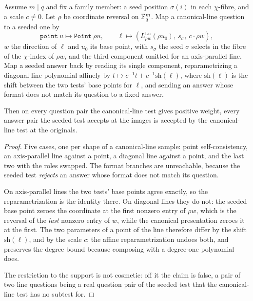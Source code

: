 \begin{lemma}
\label{lem:lidt-cl-adapter-maps}
\leanok
Assume $m\mid q$ and fix a family member: a seed position $\sigma(i)$ in each $\chi$-fibre, and a
scale $c\neq0$. Let $\rho$ be coordinate reversal on $\mathbb{F}_q^m$. Map a canonical-line question to a
seeded one by
\[
  \mathtt{point}\ u \mapsto \mathtt{Point}\ \rho u,\qquad
  \ell \mapsto (L^{\mathrm{Ln}}_{\rho w}(\rho u_0),\ s_{\sigma},\ c\cdot\rho w),
\]
$w$ the direction of $\ell$ and $u_0$ its base point, with $s_\sigma$ the seed $\sigma$ selects in
the fibre of the $\chi$-index of $\rho w$, and the third component omitted for an axis-parallel
line. Map a seeded answer back by reading its single component, reparametrizing a diagonal-line
polynomial affinely by $t\mapsto c^{-1}t+c^{-1}\mathrm{sh}(\ell)$, where $\mathrm{sh}(\ell)$ is the
shift between the two tests' base points for $\ell$, and sending an answer whose format does not
match its question to a fixed answer.

Then on every question pair the canonical-line test gives positive weight, every answer pair the
seeded test accepts at the images is accepted by the canonical-line test at the originals.
\end{lemma}

\begin{proof}
\leanok
Five cases, one per shape of a canonical-line sample: point self-consistency, an axis-parallel
line against a point, a diagonal line against a point, and the last two with the roles swapped.
The format branches are unreachable, because the seeded test \emph{rejects} an answer whose
format does not match its question.

On axis-parallel lines the two tests' base points agree exactly, so the reparametrization is the
identity there. On diagonal lines they do not: the seeded base point zeroes the coordinate at the
first nonzero entry of $\rho w$, which is the reversal of the \emph{last} nonzero entry of $w$,
while the canonical presentation zeroes it at the first. The two parameters of a point of the line
therefore differ by the shift $\mathrm{sh}(\ell)$, and by the scale $c$; the affine
reparametrization undoes both, and preserves the degree bound because composing with a degree-one
polynomial does.

The restriction to the support is not cosmetic: off it the claim is false, a pair of two line
questions being a real question pair of the seeded test that the canonical-line test has no
subtest for.
\end{proof}


